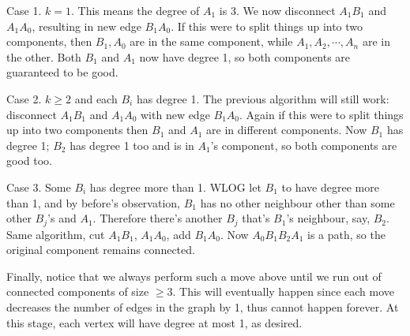 \documentclass[11pt,a4paper]{article}
\begin{document}
\begin{enumerate}
	Case 1. $k=1$. This means the degree of $A_1$ is 3. We now disconnect $A_1B_1$ and $A_1A_0$, resulting in new edge $B_1A_0$. If this were to split things up into two components, then $B_1, A_0$ are in the same component, while $A_1, A_2, \cdots , A_n$ are in the other. Both $B_1$ and $A_1$ now have degree 1, so both components are guaranteed to be good.
	
	Case 2. $k\ge 2$ and each $B_i$ has degree 1. The previous algorithm will still work: disconnect $A_1B_1$ and $A_1A_0$ with new edge $B_1A_0$. Again if this were to split things up into two components then $B_1$ and $A_1$ are in different components. Now $B_1$ has degree 1; $B_2$ has degree 1 too and is in $A_1$'s component, so both components are good too.
	
	Case 3. Some $B_i$ has degree more than 1. WLOG let $B_1$ to have degree more than 1, and by before's observation, $B_1$ has no other neighbour other than some other $B_j$'s and $A_1$. Therefore there's another $B_j$ that's $B_1$'s neighbour, say, $B_2$. Same algorithm, cut $A_1B_1$, $A_1A_0$, add $B_1A_0$. Now $A_0B_1B_2A_1$ is a path, so the original component remains connected.
	
	Finally, notice that we always perform such a move above until we run out of connected components of size $\ge 3$. This will eventually happen since each move decreases the number of edges in the graph by 1, thus cannot happen forever. At this stage, each vertex will have degree at most 1, as desired.
\end{enumerate}
\end{document}
